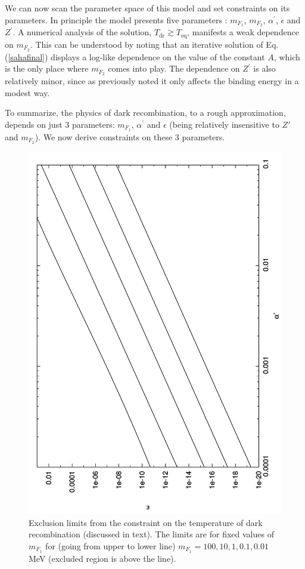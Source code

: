 \documentclass[12pt]{article}
\begin{document}
We can now scan the parameter space of this model and set constraints on its parameters. In principle the model presents five parameters : $m _{F_1}$, $m _{F_2}$, $\alpha ^{'}$, $\epsilon$ and $Z ^{'}$. A numerical analysis of the solution, $T _{\text{dr}} \gtrsim T _{\text{eq}}$, manifests a weak dependence on $m _{F_2}$. This can be understood by noting that an iterative solution of Eq.(\ref{sahafinal}) displays a log-like dependence on the value of the constant $A$, which is the only place where $m _{F_2}$ comes into play. The dependence on $Z ^{'}$ is also relatively minor, since as previously noted it only affects the binding energy in a modest way.

To summarize, the physics of dark recombination, to a rough approximation, depends on just 3 parameters: $m _{F_1}$, $\alpha ^{'}$ and $\epsilon$ (being relatively insensitive to $Z'$ and $m _{F_2}$). We now derive constraints on these 3 parameters.

\begin{figure}[htpb]
    \centering
        \includegraphics[scale=0.45, angle=270]{fig7}
    \caption{Exclusion limits from the constraint on the temperature of dark recombination (discussed in text). The limits are for fixed values of $m _{F_1}$ for (going from upper to lower line) $m _{F_1} = 100, 10, 1, 0.1, 0.01$ MeV (excluded region is above the line).}
    \label{fig:Exclusion dark recombination mf1}
\end{figure}
\end{document}
